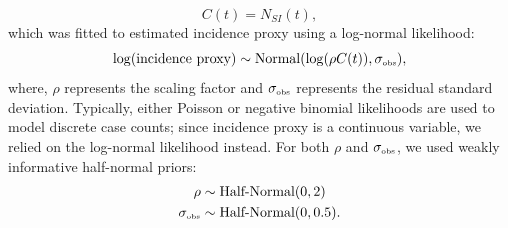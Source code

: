\documentclass[12pt]{article}
\newcommand{\tsub}[2]{#1_{{\textrm{\tiny #2}}}}
\begin{document}
\begin{equation}
C(t) = N_{SI}(t),
\end{equation}
which was fitted to estimated incidence proxy using a log-normal likelihood:
\begin{equation}
\log (\textrm{incidence proxy}) \sim \mathrm{Normal}(\log (\rho C(t)), \tsub{\sigma}{obs}),
\end{equation}
where, $\rho$ represents the scaling factor and $\tsub{\sigma}{obs}$ represents the residual standard deviation.
Typically, either Poisson or negative binomial likelihoods are used to model discrete case counts;
since incidence proxy is a continuous variable, we relied on the log-normal likelihood instead.
For both $\rho$ and $\tsub{\sigma}{obs}$, we used weakly informative half-normal priors:
\begin{align}
\rho &\sim \textrm{Half-Normal}(0, 2)\\
\tsub{\sigma}{obs} &\sim \textrm{Half-Normal}(0, 0.5).
\end{align}
\end{document}
